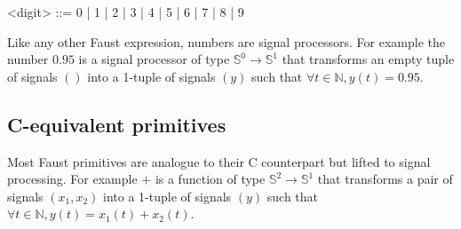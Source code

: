 \documentclass[a4paper]{book}
\begin{document}
\begin{grammar}
  <digit> ::= 
  0 | 1 | 2 | 3 | 4 | 5 | 6 | 7 | 8 | 9
\end{grammar}


\vspace{5 mm}

Like any other Faust expression, numbers are signal processors. For example the number $0.95$ is a signal processor of type $\mathbb{S}^{0}\rightarrow\mathbb{S}^{1}$ that transforms an empty tuple of signals $()$ into a 1-tuple of signals $(y)$ such that $\forall t\in\mathbb{N}, y(t)=0.95$.



\subsection{C-equivalent primitives}

Most Faust primitives are analogue to their C counterpart but lifted to signal processing.
For example $+$ is a function of type $\mathbb{S}^{2}\rightarrow\mathbb{S}^{1}$ that transforms a pair of signals $(x_1,x_2)$ into a 1-tuple of signals $(y)$ such that $\forall t\in\mathbb{N}, y(t)=x_{1}(t)+x_{2}(t)$.

\vspace{5 mm}
\end{document}
